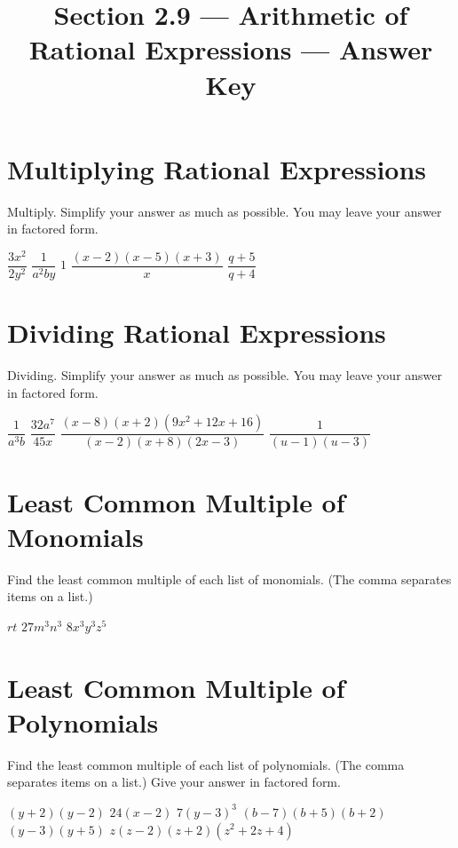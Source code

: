

\title{Section 2.9 --- Arithmetic of Rational Expressions --- Answer Key}


\maketitle
\section*{Multiplying Rational Expressions}
Multiply.  Simplify your answer as much as possible.  You may leave your answer in factored form.
\begin{smenum}
\mitemxxx
{$\dfrac{3x^2}{2y^2}$}
{$\dfrac{1}{a^2by}$}
{$1$}
\mitemxxo
{$\dfrac{(x-2)(x-5)(x+3)}{x}$}
{$\dfrac{q+5}{q+4}$}
\end{smenum}

\section*{Dividing Rational Expressions}
Dividing.  Simplify your answer as much as possible.  You may leave your answer in factored form.
\begin{smenum}
\mitemxx
{$\dfrac{1}{a^3b}$}
{$\dfrac{32a^7}{45x}$}
\mitemxx
{$\dfrac{(x-8)(x+2)(9x^2+12x+16)}{(x-2)(x+8)(2x-3)}$}
{$\dfrac{1}{(u-1)(u-3)}$}
\end{smenum}

\section*{Least Common Multiple of Monomials}
Find the least common multiple of each list of monomials.  (The comma separates items on a list.)
\begin{smenum}
\mitemxxx
{$rt$}
{$27m^3n^3$}
{$8x^3y^3z^5$}
\end{smenum}

\section*{Least Common Multiple of Polynomials}
Find the least common multiple of each list of polynomials.  (The comma separates items on a list.)  Give your answer in factored form.
\begin{smenum}
\mitemxxx
{$(y+2)(y-2)$}
{$24(x-2)$}
{$7(y-3)^3$}
\mitemxxx
{$(b-7)(b+5)(b+2)$}
{$(y-3)(y+5)$}
{$z(z-2)(z+2)(z^2+2z+4)$}
\end{smenum}

